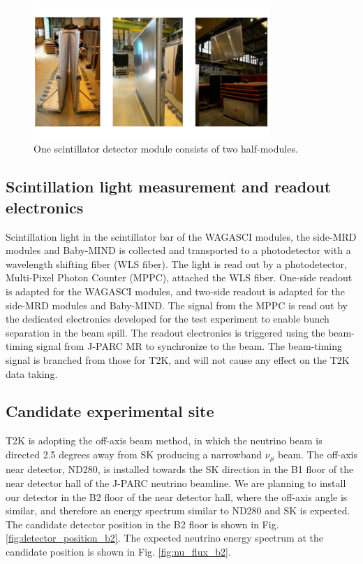 \begin{figure}%
  \begin{center}
  \includegraphics[width=0.8\textwidth]{figs/scinti_layer_baby_mind.pdf}
  \caption{One scintillator detector module consists of two half-modules.}
  \label{fig:scinti_layer_baby_mind}
  \end{center}
\end{figure}



\subsection{Scintillation light measurement and readout electronics}
Scintillation light in the scintillator bar of the WAGASCI modules, the side-MRD modules and Baby-MIND is collected and transported to a photodetector with a wavelength shifting fiber (WLS fiber).
The light is read out by a photodetector, Multi-Pixel Photon Counter (MPPC), attached the 
WLS fiber.
One-side readout is adapted for the WAGASCI modules,
and two-side readout is adapted for the side-MRD modules and Baby-MIND.
The signal from the MPPC is read out by the dedicated electronics developed for the test experiment
to enable bunch separation in the beam spill.
The readout electronics is triggered using the beam-timing signal from J-PARC MR to synchronize to the beam.
The beam-timing signal is branched from those for T2K, and will not cause any effect on the T2K data taking.


\subsection{Candidate experimental site}
T2K is adopting the off-axis beam method, in which the neutrino beam is directed 2.5 degrees
away from SK producing a narrowband $\nu_{\mu}$ beam.
The off-axis near detector, ND280, is installed towards the SK direction in the B1 floor of the near detector hall of the J-PARC neutrino beamline.
We are planning to install our detector in the B2 floor of the near detector hall,
where the off-axis angle is similar, and therefore an energy spectrum similar to ND280 and SK is expected.
The candidate detector position in the B2 floor is shown in Fig. \ref{fig:detector_position_b2}.
The expected neutrino energy spectrum at the candidate position is shown in Fig. \ref{fig:nu_flux_b2}.

